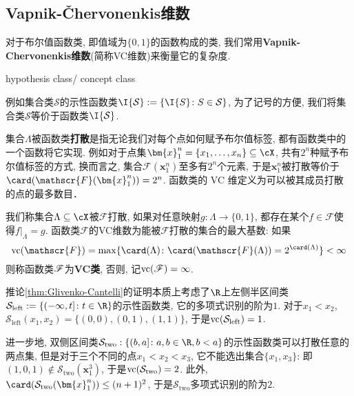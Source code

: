 \subsection{Vapnik-Čhervonenkis维数}

对于布尔值函数类, 即值域为$\{0, 1\}$的函数构成的类, 我们常用\textbf{Vapnik-Chervonenkis维数}(简称VC维数)来衡量它的复杂度. 

hypothesis class/ concept class

例如集合类$\mathcal{S}$的示性函数类$\I{\mathcal{S}} := \{\I{S} \colon S \in \mathcal{S} \}$, 为了记号的方便, 我们将集合类$\mathcal{S}$等价于函数类$\I{\mathcal{S}}$. 
 
 


集合$\Lambda$被函数类\textbf{打散}是指无论我们对每个点如何赋予布尔值标签, 都有函数类中的一个函数将它实现. 
例如对于点集$\bm{x}_1^n =\{x_1, \dots, x_n\} \subseteq \cX$, 共有$2^n$种赋予布尔值标签的方式, 换而言之, 集合$\mathscr{F}(\bm{x}_1^n)$至多有$2^n$个元素, 于是$\bm{x}_1^n$被打散等价于$\card(\mathscr{F}(\bm{x}_1^n)) = 2^n$. 
函数类的 VC 维定义为可以被其成员打散的点的最多数目．

\begin{definition}[VC维数]
	我们称集合$\Lambda \subseteq \cX$被$\mathscr{F}$打散, 如果对任意映射$g \colon \Lambda \to \{0, 1\}$, 都存在某个$f \in \mathscr{F}$使得$f|_{\Lambda} = g$.
	函数类$\mathscr{F}$的VC维数为能被$\mathscr{F}$打散的集合的最大基数: 如果
	\begin{equation*}
		\vc(\mathscr{F}) = \max \{\card(\Lambda) \colon \card(\mathscr{F}(\Lambda)) = 2^{\card(\Lambda)} \} < \infty
	\end{equation*}
	则称函数类$\mathscr{F}$为\textbf{VC类}, 否则, 记$\mathrm{vc}(\mathscr{F}) = \infty$. 
\end{definition}

\begin{example}
	推论\ref{thm:Glivenko-Cantelli}的证明本质上考虑了$\R$上左侧半区间类$\mathcal{S}_{\text{left}} := \{(-\infty, t] \colon t \in \R \}$的示性函数类, 它的多项式识别的阶为$1$. 
	对于$x_1 < x_2$, $\mathcal{S}_{\text{left}}(x_1, x_2) = \{(0,0), (0,1), (1,1)\}$, 于是$\mathrm{vc}(\mathcal{S}_{\text{left}}) = 1$. 
	
	进一步地, 双侧区间类$\mathcal{S}_{\text{two}} :\{(b, a] \colon a, b \in \R, b < a \}$的示性函数类可以打散任意的两点集, 但是对于三个不同的点$x_1 < x_2 < x_3$, 它不能选出集合$\{x_1, x_3\}$: 即$(1,0,1) \notin \mathcal{S}_{\text{two}}(\bm{x}_1^3)$, 于是$\mathrm{vc}(\mathcal{S}_{\text{two}}) = 2$. 
	此外, $\card(\mathcal{S}_{\text{two}}(\bm{x}_1^n)) \leq (n+1)^2$, 于是$\mathcal{S}_{\text{two}}$多项式识别的阶为$2$. 
\end{example}


